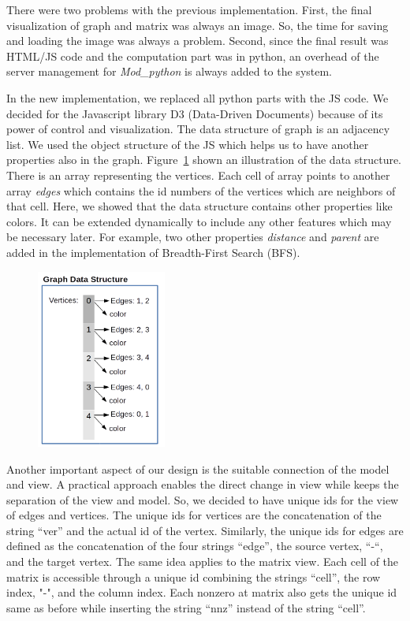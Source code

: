 \documentclass[12pt, twoside]{book}
\begin{document}
There were two problems with the previous implementation. First, the final visualization
of graph and matrix was always an image.
So, the time for saving and loading the image was always a problem.
Second, since the final result was HTML/JS code and the computation part was in python,
an overhead of the server management for \textit{Mod\_python} is always added to the system.

In the new implementation, we replaced all python parts with the JS code.
We decided for the Javascript library D3 (Data-Driven Documents)
because of its power of control and visualization.
The data structure of graph is an adjacency list.
We used the object structure of the JS which helps us to have another
properties also in the graph. Figure~\ref{f.graph-ds} shown an illustration
of the data structure. There is an array representing the vertices.
Each cell of array points to another array \textit{edges} which contains
the id numbers of the vertices which are neighbors of that cell.
Here, we showed that the data structure contains other properties like colors.
It can be extended dynamically to include any other features which may be necessary later. For example, two other properties \textit{distance} and \textit{parent} are added
in the implementation of Breadth-First Search (BFS).

\begin{figure}
\centering
\includegraphics[width=0.38\textwidth]{graph}
\caption{}
\label{f.graph-ds}
\end{figure}

Another important aspect of our design is the suitable connection of the
model and view. A practical approach enables the direct change in view while keeps the
separation of the view and model. So, we decided to have unique ids for the view of
edges and vertices. The unique ids for vertices are the concatenation of the
string “ver” and the actual id of the vertex. Similarly, the unique ids for edges are
defined as the concatenation of the four strings “edge”, the source vertex, “-“,
and the target vertex. The same idea applies to the matrix view. Each cell of the matrix
is accessible through a unique id combining the strings “cell”, the row index,
"-", and the column index. Each nonzero at matrix also gets the unique id same as before
while inserting the string “nnz” instead of the string “cell”.
\end{document}
